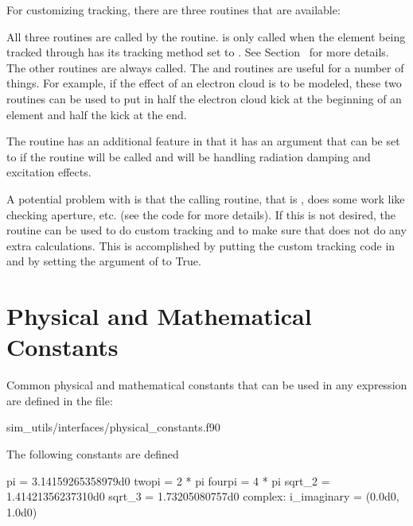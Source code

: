 {{{{{{{For customizing tracking, there are three routines that are available:
\begin{example}
\end{example}
All three routines are called by the  routine.
 is only called when the element being tracked
through has its tracking method set to . See
Section~ for more details. The other routines are
always called. The  and 
routines are useful for a number of things. For example, if the effect
of an electron cloud is to be modeled, these two routines can
be used to put in half the electron cloud kick at the beginning of
an element and half the kick at the end.

The routine  has an additional feature in that
it has an argument  that can be set to 
if the routine  will be called and  will
be handling radiation damping and excitation effects.

A potential problem with  is that the calling
routine, that is , does some work like checking aperture,
etc. (see the  code for more details). If this is not
desired, the  routine can be used to do custom
tracking and to make sure that  does not do any extra
calculations. This is accomplished by putting the custom tracking code
in  and by setting the  argument of
 to True. 

\section{Physical and Mathematical Constants}
\label{s:physical.constants}

Common physical and mathematical constants that can be used in any expression
are defined in the file:
\begin{example}
 sim_utils/interfaces/physical_constants.f90
\end{example}

The following constants are defined
\begin{example}
  pi = 3.14159265358979d0
  twopi = 2 * pi
  fourpi = 4 * pi
  sqrt_2 = 1.41421356237310d0
  sqrt_3 = 1.73205080757d0
  complex: i_imaginary = (0.0d0, 1.0d0)


\end{example}}}}}}}}
